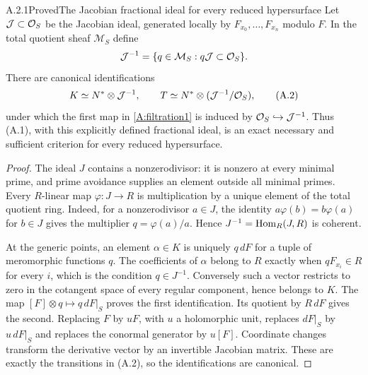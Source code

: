 \begin{statement}{A.2.1}{Proved}{The Jacobian fractional ideal for every reduced hypersurface}
Let $\mathcal J\subset\mathcal O_S$ be the Jacobian ideal, generated locally by $F_{x_0},\ldots,F_{x_n}$ modulo $F$. In the total quotient sheaf $\mathcal M_S$ define
\[
 \mathcal J^{-1}=\{q\in\mathcal M_S:q\mathcal J\subset\mathcal O_S\}.
\]
There are canonical identifications
\[
 K\simeq N^*\otimes\mathcal J^{-1},\qquad
 T\simeq N^*\otimes(\mathcal J^{-1}/\mathcal O_S),
\tag{A.2}
\]
under which the first map in \eqref{A:filtration1} is induced by $\mathcal O_S\hookrightarrow\mathcal J^{-1}$. Thus (A.1), with this explicitly defined fractional ideal, is an exact necessary and sufficient criterion for every reduced hypersurface.
\end{statement}
\begin{proof}
The ideal $J$ contains a nonzerodivisor: it is nonzero at every minimal prime, and prime avoidance supplies an element outside all minimal primes. Every $R$-linear map $\varphi:J\to R$ is multiplication by a unique element of the total quotient ring. Indeed, for a nonzerodivisor $a\in J$, the identity $a\varphi(b)=b\varphi(a)$ for $b\in J$ gives the multiplier $q=\varphi(a)/a$. Hence $J^{-1}=\operatorname{Hom}_R(J,R)$ is coherent.

At the generic points, an element $\alpha\in K$ is uniquely $q\,dF$ for a tuple of meromorphic functions $q$. The coefficients of $\alpha$ belong to $R$ exactly when $qF_{x_i}\in R$ for every $i$, which is the condition $q\in J^{-1}$. Conversely such a vector restricts to zero in the cotangent space of every regular component, hence belongs to $K$. The map $[F]\otimes q\mapsto q\,dF|_S$ proves the first identification. Its quotient by $R\,dF$ gives the second. Replacing $F$ by $uF$, with $u$ a holomorphic unit, replaces $dF|_S$ by $u\,dF|_S$ and replaces the conormal generator by $u[F]$. Coordinate changes transform the derivative vector by an invertible Jacobian matrix. These are exactly the transitions in (A.2), so the identifications are canonical.
\end{proof}



